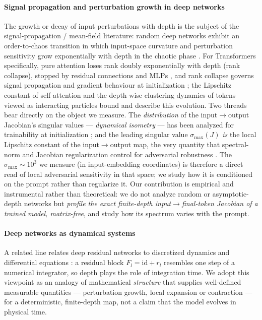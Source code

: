 \documentclass{article}
\begin{document}
\paragraph{Signal propagation and perturbation growth in deep networks}
The growth or decay of input perturbations with depth is the subject of the signal-propagation /
mean-field literature: random deep networks exhibit an order-to-chaos transition in which
input-space curvature and perturbation sensitivity grow exponentially with depth in the chaotic
phase \cite{poole2016exponential,schoenholz2017deep}. For Transformers specifically, pure attention
loses rank doubly exponentially with depth (rank collapse), stopped by residual connections and MLPs
\cite{dong2021attention}, and rank collapse governs signal propagation and gradient behaviour at
initialization \cite{noci2022signal}; the Lipschitz constant of self-attention
\cite{kim2021lipschitz} and the depth-wise clustering dynamics of tokens viewed as interacting
particles \cite{geshkovski2023emergence} bound and describe this evolution. Two threads bear directly
on the object we measure. The \emph{distribution} of the input$\to$output Jacobian's singular values
--- \emph{dynamical isometry} --- has been analyzed for trainability at initialization
\cite{pennington2017resurrecting}; and the leading singular value $\sigma_{\max}(J)$ \emph{is} the
local Lipschitz constant of the input$\to$output map, the very quantity that spectral-norm and
Jacobian regularization control for adversarial robustness \cite{yoshida2017spectral,hoffman2019robust}.
The $\sigma_{\max}\!\sim\!10^3$ we measure (in input-embedding coordinates) is therefore a direct read
of local adversarial sensitivity in that space; we study how it is conditioned on the prompt rather
than regularize it. Our contribution is
empirical and instrumental rather than theoretical: we do not analyze random or asymptotic-depth
networks but \emph{profile the exact finite-depth input$\to$final-token Jacobian of a trained model,
matrix-free}, and study how its spectrum varies with the prompt.

\paragraph{Deep networks as dynamical systems}
A related line relates deep residual networks to discretized dynamics and differential
equations \cite{he2016deep,chen2018neural,haber2017stable}: a residual block
$F_l=\mathrm{id}+r_l$ resembles one step of a numerical integrator, so depth plays the role of
integration time. We adopt this viewpoint as an analogy of mathematical \emph{structure} that
supplies well-defined measurable quantities --- perturbation growth, local expansion or contraction
--- for a deterministic, finite-depth map, not a claim that the model evolves in physical time.
\end{document}
